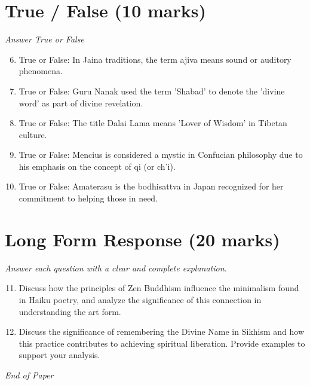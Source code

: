 \documentclass[12pt]{article}
\begin{document}
\section*{True / False (10 marks)}
\textit{Answer True or False}
\begin{enumerate}[label=\arabic*.]
\setcounter{enumi}{5}
\item True or False: In Jaina traditions, the term ajiva means sound or auditory phenomena.
\item True or False: Guru Nanak used the term 'Shabad' to denote the 'divine word' as part of divine revelation.
\item True or False: The title Dalai Lama means 'Lover of Wisdom' in Tibetan culture.
\item True or False: Mencius is considered a mystic in Confucian philosophy due to his emphasis on the concept of qi (or ch'i).
\item True or False: Amaterasu is the bodhisattva in Japan recognized for her commitment to helping those in need.
\end{enumerate}

\section*{Long Form Response (20 marks)}
\textit{Answer each question with a clear and complete explanation.}
\begin{enumerate}[label=\arabic*.]
\setcounter{enumi}{10}
\item Discuss how the principles of Zen Buddhism influence the minimalism found in Haiku poetry, and analyze the significance of this connection in understanding the art form.
\item Discuss the significance of remembering the Divine Name in Sikhism and how this practice contributes to achieving spiritual liberation. Provide examples to support your analysis.
\end{enumerate}

\vfill
\noindent\textit{End of Paper}
\end{document}
